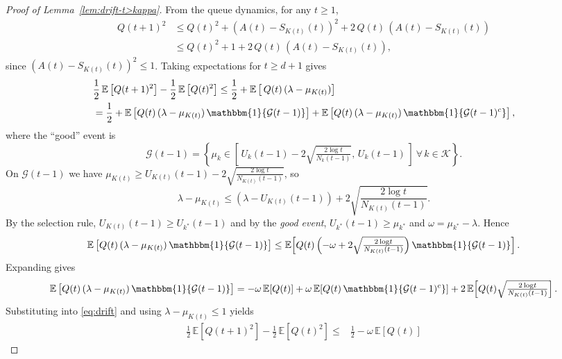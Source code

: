 \documentclass[12pt,draftcls, onecolumn]{IEEEtran}
\newcommand{\vedisc}{\omega}
\begin{document}
{\begin{proof}[Proof of Lemma~\ref{lem:drift-t>kappa}]
From the queue dynamics, for any \(t\ge1\),
\begin{equation}\label{eq:queue_dynamics}
\begin{aligned}
Q(t+1)^2
&\le Q(t)^2 + \left(A(t)-S_{K(t)}(t)\right)^2
+ 2\,Q(t)\,\left(A(t)-S_{K(t)}(t)\right)\\
&\le Q(t)^2 + 1 + 2\,Q(t)\,\left(A(t)-S_{K(t)}(t)\right),
\end{aligned}
\end{equation}
since \(\left(A(t)-S_{K(t)}(t)\right)^2\le1\).  Taking expectations for \(t\ge{d}+1\) gives
\begin{equation}\label{eq:drift}
\begin{aligned}
&\frac{1}{2}\,\mathbb{E}\left[Q(t+1)^2\right]
- \frac{1}{2}\,\mathbb{E}\left[Q(t)^2\right]
\le \frac{1}{2}
+ \mathbb{E}\left[\,Q(t)\,(\lambda-\mu_{K(t)})\right]\\
&= \frac{1}{2}
+ \mathbb{E}\left[Q(t)\,(\lambda-\mu_{K(t)})\,\mathbbm{1}\{\mathcal{G}(t-1)\}\right]
+ \mathbb{E}\left[Q(t)\,(\lambda-\mu_{K(t)})\,\mathbbm{1}\{\mathcal{G}(t-1)^c\}\right],
\end{aligned}
\end{equation}
where the “good” event is
\[
\mathcal{G}(t-1)
=\left\{\mu_k \in [\,U_k(t-1)-2\sqrt{\tfrac{2\log\!t}{N_k(t-1)}},\,U_k(t-1)\,]\ \forall\,k\in\mathcal{K}\right\}.
\]
On \(\mathcal{G}(t-1)\) we have
\(\mu_{K(t)}\ge U_{K(t)}(t-1)-2\sqrt{\tfrac{2\log\!t}{N_{K(t)}(t-1)}}\),
so
\[
\lambda-\mu_{K(t)}
\le \left(\lambda - U_{K(t)}(t-1)\right)
+2\sqrt{\frac{2\log\!t}{N_{K(t)}(t-1)}}.
\]
By the selection rule,
\(U_{K(t)}(t-1)\ge U_{k^*}(t-1)\) and by the \emph{good event},
\( U_{k^*}(t-1)\ge\mu_{k^*}\)
and \(\vedisc=\mu_{k^*}-\lambda\).  Hence
\[
\mathbb{E}\left[Q(t)\,(\lambda-\mu_{K(t)})\,\mathbbm{1}\{\mathcal{G}(t-1)\}\right]
\le \mathbb{E}\!\left[Q(t)\left(-\vedisc+2\sqrt{\tfrac{2\log\!t}{N_{K(t)}(t-1)}}\right)\mathbbm{1}\{\mathcal{G}(t-1)\}\right].
\]
Expanding gives
\[
\mathbb{E}\left[Q(t)\,(\lambda-\mu_{K(t)})\,\mathbbm{1}\{\mathcal{G}(t-1)\}\right]
=-\vedisc\,\mathbb{E}[Q(t)]
+\vedisc\,\mathbb{E}\!\left[Q(t)\,\mathbbm{1}\{\mathcal{G}(t-1)^c\}\right]
+2\,\mathbb{E}\!\left[Q(t)\sqrt{\tfrac{2\log\!t}{N_{K(t)}(t-1)}}\right].
\]
Substituting into \eqref{eq:drift} and using
\(\lambda-\mu_{K(t)}\le1\) yields
\begin{align}
\frac{1}{2}\,\mathbb{E}\left[Q(t+1)^2\right]
- \frac{1}{2}\,\mathbb{E}\left[Q(t)^2\right]
\le &\frac{1}{2}
-\vedisc\,\mathbb{E}[Q(t)]

\end{align}
\end{proof}}
\end{document}
